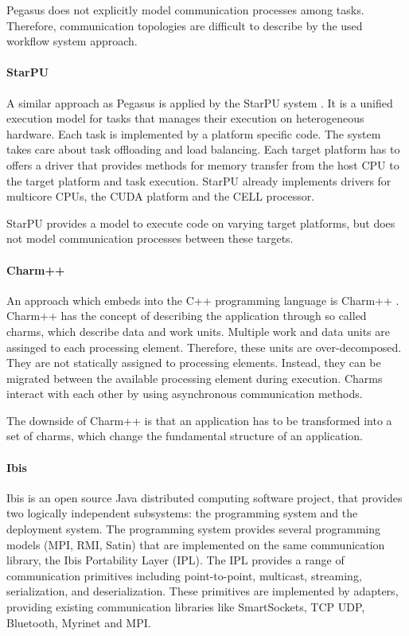 Pegasus does not explicitly model communication processes among tasks.
Therefore, communication topologies are difficult to describe by the
used workflow system approach.


\paragraph*{StarPU} 
A similar approach as Pegasus is applied by the StarPU system
\cite{ref:starpu}.  It is a unified execution model for tasks that
manages their execution on heterogeneous hardware.  Each task is
implemented by a platform specific code. The system takes care about
task offloading and load balancing. Each target platform has to offers
a driver that provides methods for memory transfer from the host CPU
to the target platform and task execution. StarPU already implements
drivers for multicore CPUs, the CUDA platform and the CELL processor.

StarPU provides a model to execute code on varying target platforms,
but does not model communication processes between these targets.

\paragraph*{Charm++} 
An approach which embeds into the C++ programming language is Charm++
\cite{ref:charm}. Charm++ has the concept of describing the
application through so called charms, which describe data and work
units. Multiple work and data units are assinged to each processing
element. Therefore, these units are over-decomposed.  They are not
statically assigned to processing elements. Instead, they can be
migrated between the available processing element during
execution. Charms interact with each other by using asynchronous
communication methods.

The downside of Charm++ is that an application has to be transformed
into a set of charms, which change the fundamental structure of an
application.

\paragraph*{Ibis} 
Ibis \cite{ref:ibis} is an open source Java distributed computing
software project, that provides two logically independent subsystems:
the programming system and the deployment system. The programming
system provides several programming models (MPI, RMI, Satin) that are
implemented on the same communication library, the Ibis Portability
Layer (IPL).  The IPL provides a range of communication primitives
including point-to-point, multicast, streaming, serialization, and
deserialization. These primitives are implemented by adapters,
providing existing communication libraries like SmartSockets, TCP UDP,
Bluetooth, Myrinet and MPI.

